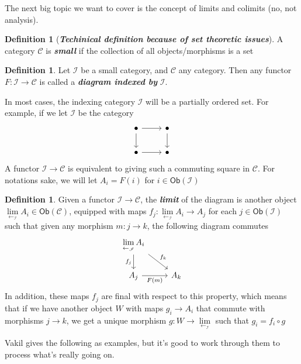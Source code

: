 \documentclass[psamsfonts]{amsart}
\theoremstyle{definition}
\newtheorem{defn}[thm]{Definition}
\theoremstyle{remark}
\newcommand{\ib}[1]{\textbf{\textit{#1}}}
\begin{document}
The next big topic we want to cover is the concept of limits and colimits (no, not analysis).
%
\begin{defn}[\ib{Techinical definition because of set theoretic issues}]
A category $\mathscr{C}$ is \ib{small} if the collection of all objects/morphisms is a set
\end{defn}
%
\begin{defn}
Let $\mathscr{I}$ be a small category, and $\mathscr{C}$ any category. Then any functor $F : \mathscr{I} \to \mathscr{C}$ is called a \ib{diagram indexed by} $\mathscr{I}$.
\end{defn}
In most cases, the indexing category $\mathscr{I}$ will be a partially ordered set. For example, if we let $\mathscr{I}$ be the category
$$\begin{tikzcd}
  \bullet \arrow[r] \arrow[d] & \bullet \arrow[d] \\
  \bullet \arrow[r] & \bullet
  \end{tikzcd}
$$
A functor $\mathscr{I} \to \mathscr{C}$ is equivalent to giving such a commuting square in $\mathscr{C}$. For notations sake, we will let $A_i = F(i)$ for $i \in \mathsf{Ob}(\mathscr{I})$
%
\begin{defn}
Given a functor $\mathscr{I} \to \mathscr{C}$, the \ib{limit} of the diagram is another object $\lim\limits_{\leftarrow_\mathscr{I}} A_i \in \mathsf{Ob}(\mathscr{C})$, equipped with maps $f_j : \lim\limits_{\leftarrow_{\mathscr{I}}} A_i \to A_j$ for each $j \in \mathsf{Ob}(\mathscr{I})$ such that given any morphism $m: j \to k$, the following diagram commutes
$$\begin{tikzcd}
\lim\limits_{\leftarrow_{\mathscr{I}}}A_i \arrow[d,"f_j"'] \arrow[dr, "f_k"] \\
A_j \arrow[r, "F(m)"']  & A_k
\end{tikzcd}$$
In addition, these maps $f_j$ are final with respect to this property, which means that if we have another object $W$ with maps $g_i \to A_i$ that commute with morphisms $j \to k$, we get a unique morphism $g: W \to \lim\limits_{\leftarrow_{\mathscr{I}}}$ such that $g_i = f_i \circ g$
\end{defn}
%
Vakil gives the following as examples, but it's good to work through them to process what's really going on.
%
\end{document}
